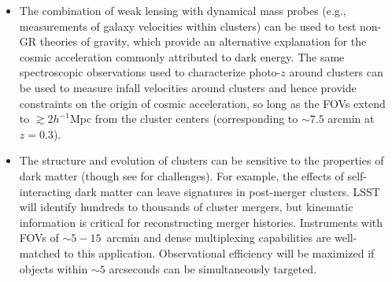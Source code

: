 \begin{itemize}
\item The combination of weak lensing with dynamical mass probes (e.g., measurements of galaxy
  velocities within clusters) can be used to test non-GR theories of gravity, which provide an
  alternative explanation for the cosmic acceleration commonly attributed to dark energy. The same
  spectroscopic observations used to characterize photo-$z$ around clusters can be used to measure infall velocities around clusters and hence provide constraints on the origin of cosmic acceleration, so long as the FOVs extend to $\gtrsim 2h^{-1}$Mpc from the cluster centers (corresponding to $\sim 7.5$ arcmin at $z=0.3$).

\item The structure
and evolution of clusters can be sensitive to the properties of dark matter (though see 
\citealt{Peter} for challenges). For example, the
effects of self-interacting dark matter can leave signatures in post-merger clusters.  LSST will
identify hundreds to thousands of cluster mergers, %
but kinematic
information is critical for reconstructing  merger histories.
Instruments with FOVs of $\sim 5-15$~arcmin and dense multiplexing capabilities are
well-matched to this application. Observational efficiency will be maximized if objects within
$\sim5$ arcseconds can be simultaneously targeted. 
\end{itemize}

